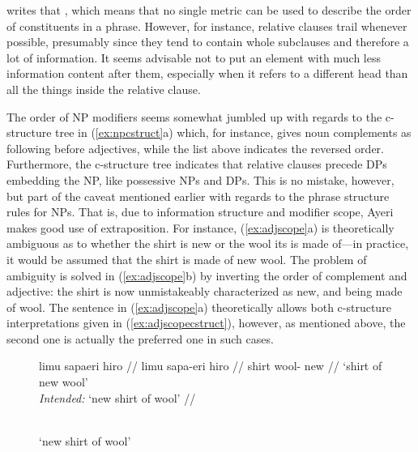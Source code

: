 \citet{wasow1997} writes that , which means
that no single metric can be used to describe the order of constituents in a
phrase. However, for instance, relative clauses trail whenever possible,
presumably since they tend to contain whole subclauses and therefore a lot of
information. It seems advisable not to put an element with much less
information content after them, especially when it refers to a different head
than all the things inside the relative clause.

The order of NP modifiers seems somewhat jumbled up with regards to the
c-structure tree in (\ref{ex:npcstruct}a) which, for instance, gives noun
complements as following  before adjectives, while the list above
indicates the reversed order. Furthermore, the c-structure tree indicates that
relative clauses precede DPs embedding the NP, like possessive NPs and DPs.
This is no mistake, however, but part of the caveat mentioned earlier with
regards to the phrase structure rules for NPs. That is, due to information
structure and modifier scope, Ayeri makes good use of extraposition. For
instance, (\ref{ex:adjscope}a) is theoretically ambiguous as to whether the
shirt is new or the wool its is made of---in practice, it would be assumed that
the shirt is made of new wool. The problem of ambiguity is solved in
(\ref{ex:adjscope}b) by inverting the order of complement and adjective: the
shirt is now unmistakeably characterized as new, and being made of wool. The
sentence in (\ref{ex:adjscope}a) theoretically allows both c-structure
interpretations given in (\ref{ex:adjscopecstruct}), however, as mentioned
above, the second one is actually the preferred one in such cases.

\begin{figure}
\pex\label{ex:adjscope}
\a\label{ex:adjscope_1}\ljudge\excl%
\begingl
	\gla limu sapaeri hiro //
	\glb limu sapa-eri hiro //
	\glc shirt wool-\Ins{} new //
	\glft `shirt of new wool'\\
		\textit{Intended:} `new shirt of wool' //
\endgl

\a\label{ex:adjscope_2}%
\begin{minipage}[t]{\linewidth}
	 \\
	`new shirt of wool'
\end{minipage}
\xe
\end{figure}

